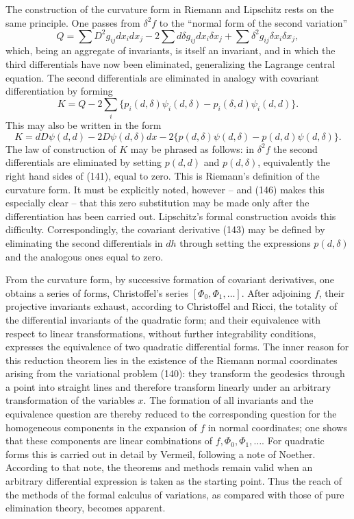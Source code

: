 \documentclass[11pt]{article}
\begin{document}
The construction of the curvature form in Riemann and Lipschitz rests on the same principle. One passes from $\delta^2 f$ to the ``normal form of the second variation''
\begin{equation}
  Q=\sum D^2g_{ij}dx_i dx_j-2\sum d\delta g_{ij}dx_i\delta x_j+\sum \delta^2 g_{ij}\delta x_i\delta x_j,             \tag{144}
\end{equation}
which, being an aggregate of invariants, is itself an invariant, and in which the third differentials have now been eliminated, generalizing the Lagrange central equation. The second differentials are eliminated in analogy with covariant differentiation by forming
\begin{equation}
  K=Q-2\sum_i\{p_i(d,\delta)\psi_i(d,\delta)-p_i(\delta,d)\psi_i(d,d)\}.       \tag{145}
\end{equation}
This may also be written in the form
\begin{equation}
  K=dD\psi(d,d)-2D\psi(d,\delta)dx-2\{p(d,\delta)\psi(d,\delta)-p(d,d)\psi(d,\delta)\}.       \tag{146}
\end{equation}
The law of construction of $K$ may be phrased as follows: in $\delta^2 f$ the second differentials are eliminated by setting $p(d,d)$ and $p(d,\delta)$, equivalently the right hand sides of (141), equal to zero. This is Riemann's definition of the curvature form. It must be explicitly noted, however -- and (146) makes this especially clear -- that this zero substitution may be made only after the differentiation has been carried out. Lipschitz's formal construction avoids this difficulty. Correspondingly, the covariant derivative (143) may be defined by eliminating the second differentials in $dh$ through setting the expressions $p(d,\delta)$ and the analogous ones equal to zero.

From the curvature form, by successive formation of covariant derivatives, one obtains a series of forms, Christoffel's series $[\Phi_0,\Phi_1,\ldots]$. After adjoining $f$, their projective invariants exhaust, according to Christoffel and Ricci, the totality of the differential invariants of the quadratic form; and their equivalence with respect to linear transformations, without further integrability conditions, expresses the equivalence of two quadratic differential forms. The inner reason for this reduction theorem lies in the existence of the Riemann normal coordinates arising from the variational problem (140): they transform the geodesics through a point into straight lines and therefore transform linearly under an arbitrary transformation of the variables $x$. The formation of all invariants and the equivalence question are thereby reduced to the corresponding question for the homogeneous components in the expansion of $f$ in normal coordinates; one shows that these components are linear combinations of $f,\Phi_0,\Phi_1,\ldots$. For quadratic forms this is carried out in detail by Vermeil, following a note of Noether. According to that note, the theorems and methods remain valid when an arbitrary differential expression is taken as the starting point. Thus the reach of the methods of the formal calculus of variations, as compared with those of pure elimination theory, becomes apparent.
\end{document}
